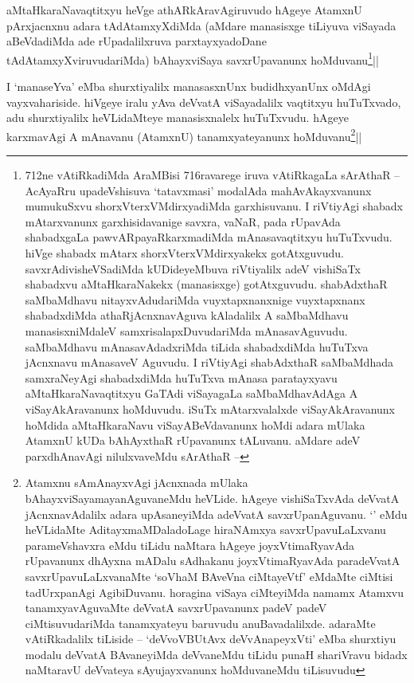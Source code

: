 \begin{artha} 
aMtaHkaraNavaqtitxyu heVge athARkAravAgiruvudo hAgeye AtamxnU 
pArxjacnxnu adara tAdAtamxyXdiMda (aMdare manasisxge tiLiyuva viSayada 
aBeVdadiMda ade rUpadalilxruva parxtayxyadoDane 
tAdAtamxyXviruvudariMda) bAhayxviSaya savxrUpavanunx 
hoMduvanu\footnote[1]{712ne vAtiRkadiMda AraMBisi 716ravarege iruva 
vAtiRkagaLa sArAthaR -- AcAyaRru upadeVshisuva `tatavxmasi' modalAda 
mahAvAkayxvanunx mumukuSxvu shorxVterxVMdirxyadiMda garxhisuvanu. I 
riVtiyAgi shabadx mAtarxvanunx garxhisidavanige savxra, vaNaR, pada 
rUpavAda shabadxgaLa pawvARpayaRkarxmadiMda mAnasavaqtitxyu 
huTuTxvudu. hiVge shabadx mAtarx shorxVterxVMdirxyakekx gotAtxguvudu. 
savxrAdivisheVSadiMda kUDideyeMbuva riVtiyalilx adeV vishiSaTx 
shabadxvu aMtaHkaraNakekx (manasisxge) gotAtxguvudu. shabAdxthaR 
saMbaMdhavu nitayxvAdudariMda vuyxtapxnanxnige vuyxtapxnanx 
shabadxdiMda athaRjAcnxnavAguva kAladalilx A saMbaMdhavu 
manasisxniMdaleV samxrisalapxDuvudariMda mAnasavAguvudu. saMbaMdhavu 
mAnasavAdadxriMda tiLida shabadxdiMda huTuTxva jAcnxnavu mAnasaveV 
Aguvudu. I riVtiyAgi shabAdxthaR saMbaMdhada samxraNeyAgi shabadxdiMda 
huTuTxva mAnasa paratayxyavu aMtaHkaraNavaqtitxyu GaTAdi viSayagaLa 
saMbaMdhavAdAga A viSayAkAravanunx hoMduvudu. iSuTx mAtarxvalalxde 
viSayAkAravanunx hoMdida aMtaHkaraNavu viSayABeVdavanunx hoMdi adara 
mUlaka AtamxnU kUDa bAhAyxthaR rUpavanunx tALuvanu. aMdare adeV 
parxdhAnavAgi nilulxvaveMdu sArAthaR --}||
\end{artha}

\begin{artha} 
I `manaseYva' eMba shurxtiyalilx manasasxnUnx budidhxyanUnx oMdAgi 
vayxvahariside. hiVgeye iralu yAva deVvatA viSayadalilx vaqtitxyu 
huTuTxvado, adu shurxtiyalilx heVLidaMteye manasisxnalelx huTuTxvudu. 
hAgeye karxmavAgi A mAnavanu (AtamxnU) tanamxyateyanunx 
hoMduvanu\footnote[1]{Atamxnu sAmAnayxvAgi jAcnxnada mUlaka 
bAhayxviSayamayanAguvaneMdu heVLide. hAgeye vishiSaTxvAda deVvatA 
jAcnxnavAdalilx adara upAsaneyiMda adeVvatA savxrUpanAguvanu. `\stext' 
eMdu heVLidaMte AditayxmaMDaladoLage hiraNAmxya savxrUpavuLaLxvanu 
parameVshavxra eMdu tiLidu naMtara hAgeye joyxVtimaRyavAda rUpavanunx 
dhAyxna mADalu sAdhakanu joyxVtimaRyavAda paradeVvatA 
savxrUpavuLaLxvanaMte `soVhaM BAveVna ciMtayeVtf' eMdaMte ciMtisi 
tadUrxpanAgi AgibiDuvanu. horagina viSaya ciMteyiMda namamx Atamxvu 
tanamxyavAguvaMte deVvatA savxrUpavanunx padeV padeV ciMtisuvudariMda 
tanamxyateyu baruvudu anuBavadalilxde. adaraMte vAtiRkadalilx tiLiside 
-- `deVvoVBUtAvx deVvAnapeyxVti' eMba shurxtiyu modalu deVvatA 
BAvaneyiMda deVvaneMdu tiLidu punaH shariVravu bidadx naMtaravU 
deVvateya sAyujayxvanunx hoMduvaneMdu tiLisuvudu}||
\end{artha}

